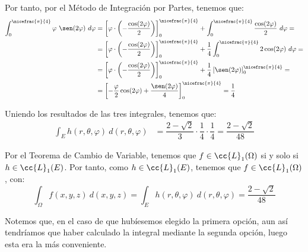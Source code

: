 \begin{ejercicio}
\begin{description}
        Por tanto, por el Método de Integración por Partes, tenemos que:
        \begin{align*}
            \int_{0}^{\nicefrac{\pi}{4}} \varphi~\sen(2\varphi)~d\varphi &= \left[\varphi\cdot \left(-\dfrac{\cos(2\varphi)}{2}\right)\right]_0^{\nicefrac{\pi}{4}} + \int_{0}^{\nicefrac{\pi}{4}} \dfrac{\cos(2\varphi)}{2}~d\varphi =\\
            &= \left[\varphi\cdot \left(-\dfrac{\cos(2\varphi)}{2}\right)\right]_0^{\nicefrac{\pi}{4}} + \dfrac{1}{4}\int_{0}^{\nicefrac{\pi}{4}} 2\cos(2\varphi)~d\varphi =\\
            &= \left[\varphi\cdot \left(-\dfrac{\cos(2\varphi)}{2}\right)\right]_0^{\nicefrac{\pi}{4}} + \dfrac{1}{4}\left[\sen(2\varphi)\right]_0^{\nicefrac{\pi}{4}} =\\
            &= \left[-\dfrac{\varphi}{2}\cos(2\varphi) + \dfrac{\sen(2\varphi)}{4}\right]_0^{\nicefrac{\pi}{4}} = \dfrac{1}{4}
        \end{align*}

        Uniendo los resultados de las tres integrales, tenemos que:
        \begin{align*}
            \int_E h(r, \theta, \varphi)~d(r, \theta, \varphi) &= \dfrac{2-\sqrt{2}}{3}\cdot \dfrac{1}{4}\cdot \dfrac{1}{4} = \dfrac{2-\sqrt{2}}{48}
        \end{align*}

        Por el Teorema de Cambio de Variable, tenemos que $f\in \cc{L}_1(\Omega)$ si y solo si $h\in \cc{L}_1(E)$. Por tanto, como $h\in \cc{L}_1(E)$, tenemos que $f\in \cc{L}_1(\Omega)$, con:
        \begin{equation*}
            \int_{\Omega} f(x, y, z)~d(x, y, z) = \int_{E} h(r, \theta, \varphi)~d(r, \theta, \varphi) = \dfrac{2-\sqrt{2}}{48}
        \end{equation*}
    \end{description}

    Notemos que, en el caso de que hubíesemos elegido la primera opción, aun así tendríamos que haber calculado la integral mediante la segunda opción, luego esta era la más conveniente.
\end{ejercicio}